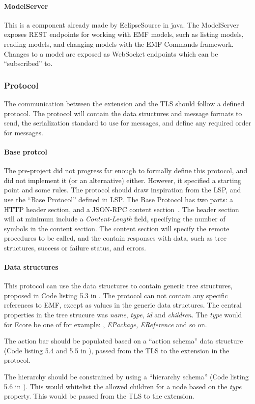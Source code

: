 \paragraph{ModelServer}
This is a component already made by EclipseSource in java.
The ModelServer exposes \gls{REST} endpoints for working with \acrshort{EMF} models, such as listing models, reading models, and changing models with the EMF Commands framework.
Changes to a model are exposed as \gls{WebSocket} endpoints which can be ``subscribed'' to.


\subsubsection{Protocol}
The communication between the extension and the TLS should follow a defined protocol.
The protocol will contain the data structures and message formats to send, the serialization standard to use for messages, and define any required order for messages.


\paragraph{Base protcol}
The pre-project did not progress far enough to formally define this protocol, and did not implement it (or an alternative) either.
However, it specified a starting point and some rules.
The protocol should draw inspiration from the \acrlong{LSP}, and use the ``Base Protocol'' defined in \acrshort{LSP}.
The Base Protocol has two parts: a HTTP header section, and a \gls{JSON-RPC} content section~\cite[p.~17,18]{rekstadModelingEnvironmentCloud2020}.
The header section will at minimum include a \textit{Content-Length} field, specifying the number of symbols in the content section.
The content section will specify the remote procedures to be called, and the contain responses with data, such as tree structures, success or failure status, and errors.



\paragraph{Data structures}
This protocol can use the data structures to contain generic tree structures, proposed in Code listing 5.3 in \cite[p.~43,44]{rekstadModelingEnvironmentCloud2020}. %
The protocol can not contain any specific references to \acrshort{EMF}, except as values in the generic data structures.
The central properties in the tree strucure was \textit{name}, \textit{type}, \textit{id} and \textit{children}.
The \textit{type} would for \gls{Ecore} be one of for example: , \textit{EPackage}, \textit{EReference} and so on.


The action bar should be populated based on a ``action schema'' data structure (Code listing 5.4 and 5.5 in \cite[p.~45]{rekstadModelingEnvironmentCloud2020}), passed from the TLS to the extension in the protocol.


The hierarchy should be constrained by using a ``hierarchy schema'' (Code listing 5.6 in \cite[p.~45]{rekstadModelingEnvironmentCloud2020}).
This would whitelist the allowed children for a node based on the \textit{type} property.
This would be passed from the TLS to the extension.
